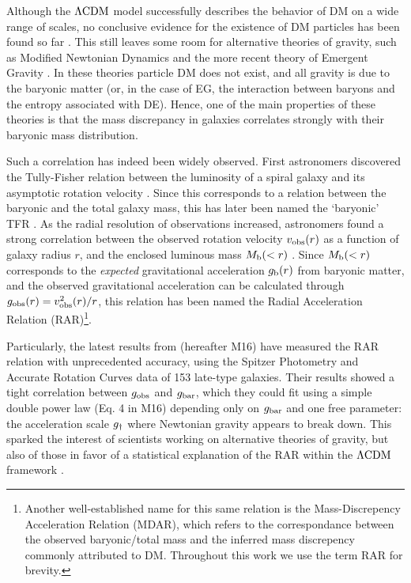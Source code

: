 \documentclass[usenatbib]{mnras}
\newcommand{\lcdm}{{\rm \Lambda CDM}}
\newcommand{\un}[1]{_{\rm #1}}
\begin{document}
Although the $\lcdm$ model successfully describes the behavior of DM on a wide range of scales, no conclusive evidence for the existence of DM particles has been found so far \cite[despite years of enormous effort; for an overview, see][]{bertone2005,bertone2018}. This still leaves some room for alternative theories of gravity, such as Modified Newtonian Dynamics  \cite[MOND,][]{milgrom1983} and the more recent theory of Emergent Gravity \cite[EG,][]{verlinde2016}. In these theories particle DM does not exist, and all gravity is due to the baryonic matter (or, in the case of EG, the interaction between baryons and the entropy associated with DE). Hence, one of the main properties of these theories is that the mass discrepancy in galaxies correlates strongly with their baryonic mass distribution.

Such a correlation has indeed been widely observed. First astronomers discovered the Tully-Fisher relation \cite[TFR,][]{tully1977} between the luminosity of a spiral galaxy and its asymptotic rotation velocity \cite[]{pierce1988,bernstein1994}. Since this corresponds to a relation between the baryonic and the total galaxy mass, this has later been named the `baryonic' TFR \cite[BTFR,][]{mcgaugh2000,mcgaugh2012}. As the radial resolution of observations increased, astronomers found a strong correlation between the observed rotation velocity $v\un{obs}(r)$ as a function of galaxy radius $r$, and the enclosed luminous mass \mbox{$M\un{b}(<r)$} \cite[]{sanders1986,sanders1996,mcgaugh2004,sanders2007,wu2015}. Since $M\un{b}(<r)$ corresponds to the \emph{expected} gravitational acceleration $g\un{b}(r)$ from baryonic matter, and the observed gravitational acceleration can be calculated through $g\un{obs}(r)=v\un{obs}^2(r)/r$, this relation has been named the Radial Acceleration Relation (RAR)\footnote{Another well-established name for this same relation is the Mass-Discrepency Acceleration Relation (MDAR), which refers to the correspondance between the observed baryonic/total mass and the inferred mass discrepency commonly attributed to DM. Throughout this work we use the term RAR for brevity.}.

Particularly, the latest results from \cite{mcgaugh2016} (hereafter M16) have measured the RAR relation with unprecedented accuracy, using the Spitzer Photometry and Accurate Rotation Curves \cite[SPARC,][]{lelli2016b} data of 153 late-type galaxies. Their results showed a tight correlation between $g\un{obs}$ and $g\un{bar}$, which they could fit using a simple double power law (Eq. 4 in M16) depending only on $g\un{bar}$ and one free parameter: the acceleration scale $g\un{\dagger}$ where Newtonian gravity appears to break down. This sparked the interest of scientists working on alternative theories of gravity, but also of those in favor of a statistical explanation of the RAR within the $\lcdm$ framework \cite[]{keller2017,desmond2017,ludlow2017}.
\end{document}
